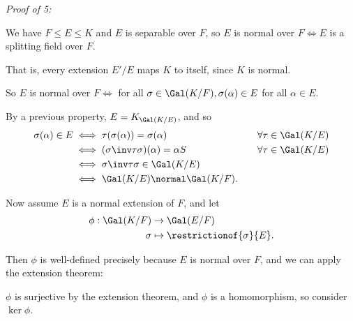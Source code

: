 \emph{Proof of 5:}

We have \(F\leq E \leq K\) and \(E\) is separable over \(F\), so \(E\)
is normal over \(F \iff E\) is a splitting field over \(F\).

That is, every extension \(E'/E\) maps \(K\) to itself, since \(K\) is
normal.

\begin{center}
\end{center}

So \(E\) is normal over \(F \iff\) for all
\(\sigma \in \Gal(K/F), \sigma(\alpha) \in E\) for all \(\alpha \in E\).

By a previous property, \(E = K_{\Gal(K/E)}\), and so \begin{align*}
\sigma(\alpha) \in E
&\iff \tau(\sigma(\alpha)) = \sigma(\alpha)
&\quad \forall \tau \in \Gal(K/E) \\
&\iff (\sigma\inv \tau \sigma) (\alpha) = \alpha
S&\quad \forall \tau \in \Gal(K/E) \\
&\iff \sigma\inv \tau\sigma \in \Gal(K/E) \\
&\iff \Gal(K/E) \normal \Gal(K/F)
.\end{align*}

Now assume \(E\) is a normal extension of \(F\), and let \begin{align*}
\phi: \Gal(K/F) &\to \Gal(E/F) \\
\sigma &\mapsto \restrictionof{\sigma}{E}
.\end{align*}

Then \(\phi\) is well-defined precisely because \(E\) is normal over
\(F\), and we can apply the extension theorem:

\begin{center}

\end{center}

\(\phi\) is surjective by the extension theorem, and \(\phi\) is a
homomorphism, so consider \(\ker \phi\).

